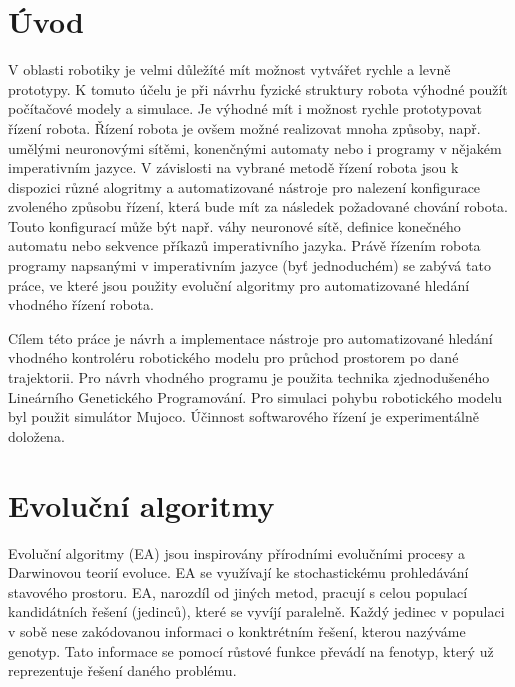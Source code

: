 
\chapter{Úvod}
V oblasti robotiky je velmi důležíté mít možnost vytvářet rychle a levně prototypy.
K tomuto účelu je při návrhu fyzické struktury robota výhodné použít počítačové modely a simulace.
Je výhodné mít i možnost rychle prototypovat řízení robota.
Řízení robota je ovšem možné realizovat mnoha způsoby, např. umělými neuronovými sítěmi, konenčnými automaty nebo i programy v nějakém imperativním jazyce.
V závislosti na vybrané metodě řízení robota jsou k dispozici různé alogritmy a automatizované nástroje pro nalezení konfigurace zvoleného způsobu řízení, která bude mít za následek požadované chování robota.
Touto konfigurací může být např. váhy neuronové sítě, definice konečného automatu nebo sekvence příkazů imperativního jazyka.
Právě řízením robota programy napsanými v imperativním jazyce (byť jednoduchém) se zabývá tato práce, ve které jsou použity evoluční algoritmy pro automatizované hledání vhodného řízení robota.

Cílem této práce je návrh a implementace nástroje pro automatizované hledání vhodného kontroléru robotického modelu pro průchod prostorem po dané trajektorii.
Pro návrh vhodného programu je použita technika zjednodušeného Lineárního Genetického Programování.
Pro simulaci pohybu robotického modelu byl použit simulátor Mujoco.
Účinnost softwarového řízení je experimentálně doložena.



\chapter{Evoluční algoritmy}
Evoluční algoritmy (EA) jsou inspirovány přírodními evolučními procesy a Darwinovou teorií evoluce.
EA se využívají ke stochastickému prohledávání stavového prostoru.
EA, narozdíl od jiných metod, pracují s celou populací kandidátních řešení (jedinců), které se vyvíjí paralelně.
Každý jedinec v populaci v sobě nese zakódovanou informaci o konktrétním řešení, kterou nazýváme genotyp.
Tato informace se pomocí růstové funkce převádí na fenotyp, který už reprezentuje řešení daného problému.

